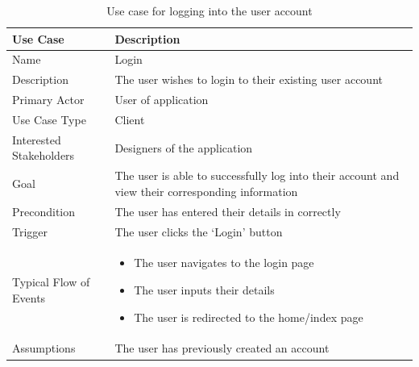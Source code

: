 \documentclass[10pt,twocolumn]{witseiepaper}
\begin{document}
		\begin{table}[htbp]
			\centering
			\caption{Use case for logging into the user account}
			\label{uc:login}
			\begin{tabular}{|p{}|p{}|}
				\hline
				\textbf{Use Case} & \textbf{Description} \\ \hline
				Name & Login \\ \hline
				Description & The user wishes to login to their existing user account \\ \hline
				Primary Actor & User of application \\ \hline
				Use Case Type & Client \\ \hline
				Interested Stakeholders & Designers of the application \\ \hline
				Goal & The user is able to successfully log into their account and view their corresponding information \\ \hline
				Precondition & The user has entered their details in correctly \\ \hline
				Trigger & The user clicks the `Login' button \\ \hline
				Typical Flow of Events & 
				\begin{itemize}
					\item The user navigates to the login page
					\item The user inputs their details
					\item The user is redirected to the home/index page
				\end{itemize}
				\\ \hline
				Assumptions & The user has previously created an account \\
				\hline
			\end{tabular}
		\end{table}
		
\end{document}
